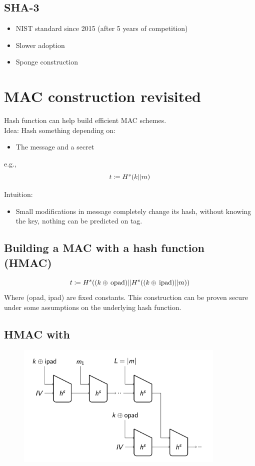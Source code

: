 \documentclass[12pt]{article}
\begin{document}
\subsection{SHA-3}
\begin{itemize}
\item NIST standard since 2015 (after 5 years of competition)
\item Slower adoption
\item Sponge construction 
\end{itemize}

\section{MAC construction revisited}
Hash function can help build efficient MAC schemes.\\
Idea: Hash something depending on:
\begin{itemize}
\item The message and a secret
\end{itemize}
e.g., 
\begin{equation*}
t\coloneqq H^s(k||m)
\end{equation*}

Intuition:
\begin{itemize}
\item Small modifications in message completely change its hash, without knowing the key, nothing can be predicted on tag.
\end{itemize}

\subsection{Building a MAC with a hash function (HMAC)}
\begin{equation*}
	t\coloneqq H^s((k \oplus\, \text{opad})||H^s((k \oplus\,\text{ipad})||m))
\end{equation*}
Where (opad, ipad) are fixed constants. This construction can be proven secure under some assumptions on the underlying hash function.
\newpage
\subsection{HMAC with \mdt}
\begin{figure}[ht]
    \centering
    \includegraphics[width=10cm]{figures/f2.png}
\end{figure}
\end{document}

